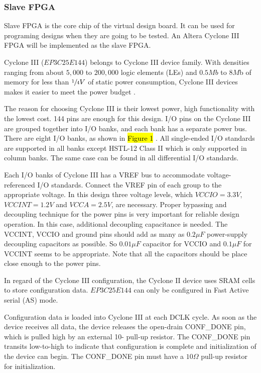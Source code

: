 \subsubsection{Slave FPGA}

Slave FPGA is the core chip of the virtual design board. It can be used for programing designs when they are going to be tested. An Altera Cyclone III FPGA will be implemented as the slave FPGA.

Cyclone III ($EP3C25E144$) belongs to Cyclone III device family. With densities ranging from about $5,000$ to $200,000$ logic elements (LEs) and $0.5Mb$ to $8M$b of memory for less than $\sfrac{1}{4}V$ of static power consumption, Cyclone III devices makes it easier to meet the power budget \citep{Altera:2011:cyclone3handbook}.

The reason for choosing Cyclone III is their lowest power, high functionality with the lowest cost. 144 pins are enough for this design. I/O pins on the Cyclone III are grouped together into I/O banks, and each bank has a separate power bus. There are eight I/O banks, as shown in \hl{Figure 1} \citep{Altera:2011:cyclone3handbook}. All single-ended I/O standards are supported in all banks except HSTL-12 Class II which is only supported in column banks. The same case can be found in all differential I/O standards.

Each I/O banks of Cyclone III has a VREF bus to accommodate voltage-referenced I/O standards. Connect the VREF pin of each group to the appropriate voltage. In this design three voltage levels, which $VCCIO=3.3V$, $VCCINT= 1.2V$ and $VCCA=2.5V$, are necessary. Proper bypassing and decoupling technique for the power pins is very important for reliable design operation. In this case, additional decoupling capacitance is needed. The VCCINT, VCCIO and ground pins should add as many as $0.2\mu F$ power-supply decoupling capacitors as possible. So $0.01\mu F$ capacitor for VCCIO and $0.1\mu F$ for VCCINT seems to be appropriate. Note that all the capacitors should be place close enough to the power pins.

In regard of the Cyclone III configuration, the Cyclone II device uses SRAM cells to store configuration data. $EP3C25E144$ can only be configured in Fast Active serial (AS) mode.

Configuration data is loaded into Cyclone III at each DCLK cycle. As soon as the device receives all data, the device releases the open-drain CONF\_DONE pin, which is pulled high by an external 10- pull-up resistor. The CONF\_DONE pin transits low-to-high to indicate that configuration is complete and initialization of the device can begin. The CONF\_DONE pin must have a $10\Omega$ pull-up resistor for initialization.

